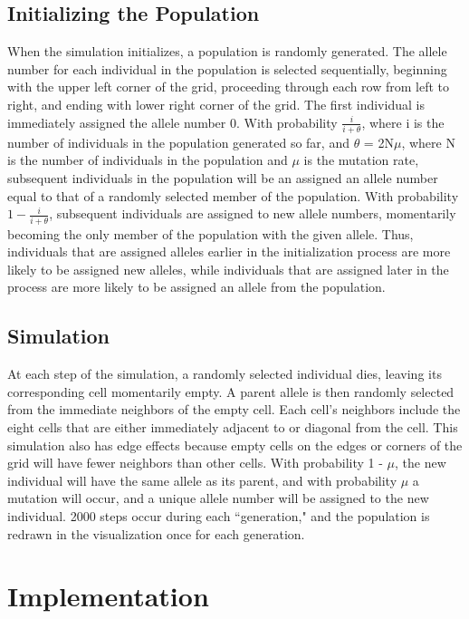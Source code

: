 \documentclass[12pt]{article}
\begin{document}
\begin{spacing}{1.6}
\subsection{Initializing the Population}
When the simulation initializes, a population is randomly generated. The allele number for each individual in the population is selected sequentially, beginning with the upper left corner of the grid, proceeding through each row from left to right, and ending with lower right corner of the grid. The first individual is immediately assigned the allele number 0. With probability $\displaystyle \frac {i}{i + \theta}$, where i is the number of individuals in the population generated so far, and $\theta$ = 2N$\mu$, where N is the number of individuals in the population and $\mu$ is the mutation rate, subsequent individuals in the population will be an assigned an allele number equal to that of a randomly selected member of the population. With probability $\displaystyle 1 - \frac{i}{i + \theta}$, subsequent individuals are assigned to new allele numbers, momentarily becoming the only member of the population with the given allele. Thus, individuals that are assigned alleles earlier in the initialization process are more likely to be assigned new alleles, while individuals that are assigned later in the process are more likely to be assigned an allele from the population.

\subsection{Simulation}
At each step of the simulation, a randomly selected individual dies, leaving its corresponding cell momentarily empty. A parent allele is then randomly selected from the immediate neighbors of the empty cell. Each cell's neighbors include the eight cells that are either immediately adjacent to or diagonal from the cell. This simulation also has edge effects because empty cells on the edges or corners of the grid will have fewer neighbors than other cells. With probability 1 - $\mu$, the new individual will have the same allele as its parent, and with probability $\mu$ a mutation will occur, and a unique allele number will be assigned to the new individual. 2000 steps occur during each ``generation," and the population is redrawn in the visualization once for each generation.

\section{Implementation}


\end{spacing}
\end{document}
